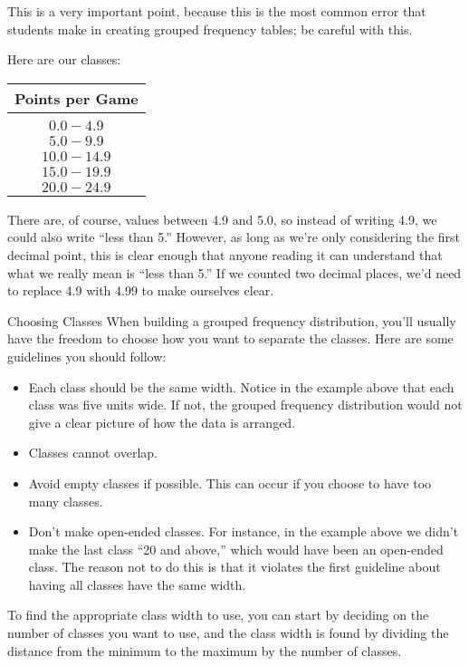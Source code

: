 This is a very important point, because this is the most common error that students make in creating grouped frequency tables; be careful with this.\\
\vfill

Here are our classes:
\begin{center}
\begin{tabular}{c}
\textbf{Points per Game}\\
\hline
\\
$0.0 - 4.9$\\
$5.0 - 9.9$\\
$10.0 - 14.9$\\
$15.0 - 19.9$\\
$20.0 - 24.9$
\end{tabular}
\end{center}

There are, of course, values between 4.9 and 5.0, so instead of writing 4.9, we could also write ``less than 5.''  However, as long as we're only considering the first decimal point, this is clear enough that anyone reading it can understand that what we really mean is ``less than 5.''  If we counted two decimal places, we'd need to replace 4.9 with 4.99 to make ourselves clear.
\vfill
\text{}
\pagebreak

\begin{proc}{Choosing Classes}
When building a grouped frequency distribution, you'll usually have the freedom to choose how you want to separate the classes.  Here are some guidelines you should follow:
\begin{itemize}
\item Each class should be the same width.  Notice in the example above that each class was five units wide.  If not, the grouped frequency distribution would not give a clear picture of how the data is arranged.
\item Classes cannot overlap.
\item Avoid empty classes if possible.  This can occur if you choose to have too many classes.
\item Don't make open-ended classes.  For instance, in the example above we didn't make the last class ``20 and above,'' which would have been an open-ended class.  The reason not to do this is that it violates the first guideline about having all classes have the same width.
\end{itemize}
\end{proc}

To find the appropriate class width to use, you can start by deciding on the number of classes you want to use, and the class width is found by dividing the distance from the minimum to the maximum by the number of classes. 

